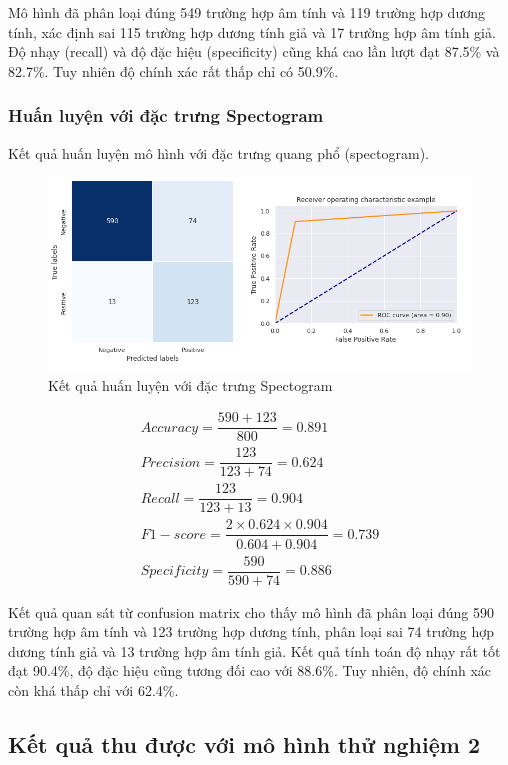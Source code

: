\documentclass[a4paper, 12pt]{article}
\begin{document}
Mô hình đã phân loại đúng 549 trường hợp âm tính và 119 trường hợp dương tính, xác định sai 115 trường hợp dương tính giả và 17 trường hợp âm tính giả. Độ nhạy (recall) và độ đặc hiệu (specificity) cũng khá cao lần lượt đạt 87.5\% và 82.7\%. Tuy nhiên độ chính xác rất thấp chỉ có 50.9\%.


\subsubsection{Huấn luyện với đặc trưng Spectogram}
\noindent
Kết quả huấn luyện mô hình với đặc trưng quang phổ (spectogram).

\begin{figure}[!h]
\captionsetup{width=0.8\textwidth}
\centering
\includegraphics[width=16.5cm]{images/5.3.png}
\caption{Kết quả huấn luyện với đặc trưng Spectogram}
\end{figure}

\begin{align*}
    Accuracy = \dfrac{590+123}{800} = 0.891\\
    Precision = \dfrac{123}{123+74} = 0.624\\
    Recall = \dfrac{123}{123+13} = 0.904\\
    F1-score = \dfrac{2\times0.624\times0.904}{0.604+0.904} = 0.739\\
    Specificity = \dfrac{590}{590+74}=0.886
\end{align*}

Kết quả quan sát từ confusion matrix cho thấy mô hình đã phân loại đúng 590 trường hợp âm tính và 123 trường hợp dương tính, phân loại sai 74 trường hợp dương tính giả và 13 trường hợp âm tính giả. Kết quả tính toán độ nhạy rất tốt đạt 90.4\%, độ đặc hiệu cũng tương đối cao với 88.6\%. Tuy nhiên, độ chính xác còn khá thấp chỉ với 62.4\%.

\subsection{Kết quả thu được với mô hình thử nghiệm 2}
\end{document}
